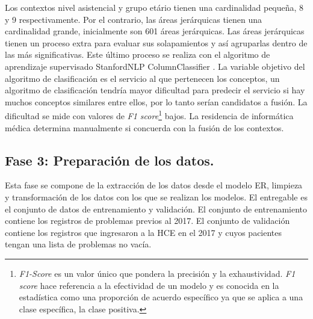 Los contextos nivel asistencial y grupo etário tienen una cardinalidad pequeña, 8 y 9 respectivamente. Por el contrario, las áreas jerárquicas tienen una cardinalidad grande, inicialmente son 601 áreas jerárquicas. Las áreas jerárquicas tienen un proceso extra para evaluar sus solapamientos y así agruparlas dentro de las más significativas. Este último proceso se realiza con el algoritmo de aprendizaje supervisado StanfordNLP ColumnClassifier \cite{manning-EtAl:2014:P14-5}. La variable objetivo del algoritmo de clasificación es  el servicio al que pertenecen los conceptos, un algoritmo de clasificación tendría mayor dificultad para predecir el servicio si hay muchos conceptos similares entre ellos, por lo tanto serían candidatos a fusión. La dificultad se mide con valores de \textit{F1 score}\footnote{\textit{F1-Score} es un valor único que pondera la precisión y la exhaustividad. \textit{F1 score} hace referencia a la efectividad de un modelo y es conocida en la estadística como una proporción de acuerdo específico ya que se aplica a una clase específica, la clase positiva.\cite{Powers2011Evaluation:Correlation}} bajos. La residencia de informática médica determina manualmente si concuerda con la fusión de los contextos.


\subsection{Fase 3: Preparación de los datos.} Esta fase se compone de la extracción de los datos desde el modelo ER, limpieza y transformación de los datos con los que se realizan los modelos. El entregable es el conjunto de datos de entrenamiento y validación. El conjunto de entrenamiento contiene los registros de problemas previos al 2017. El conjunto de validación contiene los registros que ingresaron a la \acrshort{HCE} en el 2017 y cuyos pacientes tengan una lista de problemas no vacía.

